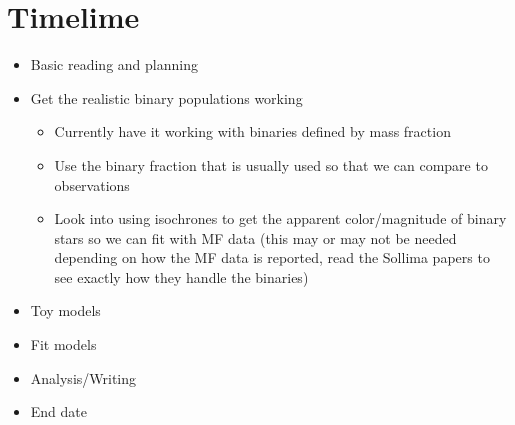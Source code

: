 \documentclass[12pt,letterpaper]{article}
\begin{document}
\section{Timelime}
\begin{itemize}
\item Basic reading and planning \checkmark
	\item Get the realistic binary populations working
	      \begin{itemize}
		      \item Currently have it working with binaries defined by mass fraction
		      \item Use the binary fraction that is usually used so that we can compare to observations
		      \item Look into using isochrones to get the apparent color/magnitude of binary
stars so we can fit with MF data (this may or may not be needed
depending on how the MF data is reported, read the Sollima papers to see
exactly how they handle the binaries)
	      \end{itemize}
	\item Toy models
	\item Fit models
	\item Analysis/Writing
	\item End date
\end{itemize}
\end{document}
